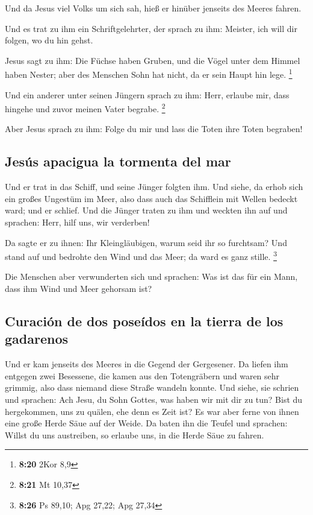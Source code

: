  Und da Jesus viel Volks um sich sah, hieß er hinüber
jenseits des Meeres fahren.

 Und es trat zu ihm ein Schriftgelehrter, der sprach zu
ihm: Meister, ich will dir folgen, wo du hin gehst.

 Jesus sagt zu ihm: Die Füchse haben Gruben, und die
Vögel unter dem Himmel haben Nester; aber des Menschen Sohn hat nicht,
da er sein Haupt hin lege. \footnote{\textbf{8:20} 2Kor 8,9}

 Und ein anderer unter seinen Jüngern sprach zu ihm:
Herr, erlaube mir, dass hingehe und zuvor meinen Vater begrabe.
\footnote{\textbf{8:21} Mt 10,37}

 Aber Jesus sprach zu ihm: Folge du mir und lass die
Toten ihre Toten begraben!

\hypertarget{jesuxfas-apacigua-la-tormenta-del-mar}{%
\subsection{Jesús apacigua la tormenta del
mar}\label{jesuxfas-apacigua-la-tormenta-del-mar}}

 Und er trat in das Schiff, und seine Jünger folgten ihm.
 Und siehe, da erhob sich ein großes Ungestüm im Meer,
also dass auch das Schifflein mit Wellen bedeckt ward; und er schlief.
 Und die Jünger traten zu ihm und weckten ihn auf und
sprachen: Herr, hilf uns, wir verderben!

 Da sagte er zu ihnen: Ihr Kleingläubigen, warum seid ihr
so furchtsam? Und stand auf und bedrohte den Wind und das Meer; da ward
es ganz stille. \footnote{\textbf{8:26} Ps 89,10; Apg 27,22; Apg 27,34}

 Die Menschen aber verwunderten sich und sprachen: Was
ist das für ein Mann, dass ihm Wind und Meer gehorsam ist?

\hypertarget{curaciuxf3n-de-dos-poseuxeddos-en-la-tierra-de-los-gadarenos}{%
\subsection{Curación de dos poseídos en la tierra de los
gadarenos}\label{curaciuxf3n-de-dos-poseuxeddos-en-la-tierra-de-los-gadarenos}}

 Und er kam jenseits des Meeres in die Gegend der
Gergesener. Da liefen ihm entgegen zwei Besessene, die kamen aus den
Totengräbern und waren sehr grimmig, also dass niemand diese Straße
wandeln konnte.  Und siehe, sie schrien und sprachen: Ach
Jesu, du Sohn Gottes, was haben wir mit dir zu tun? Bist du hergekommen,
uns zu quälen, ehe denn es Zeit ist?  Es war aber ferne
von ihnen eine große Herde Säue auf der Weide.  Da baten
ihn die Teufel und sprachen: Willst du uns austreiben, so erlaube uns,
in die Herde Säue zu fahren.


